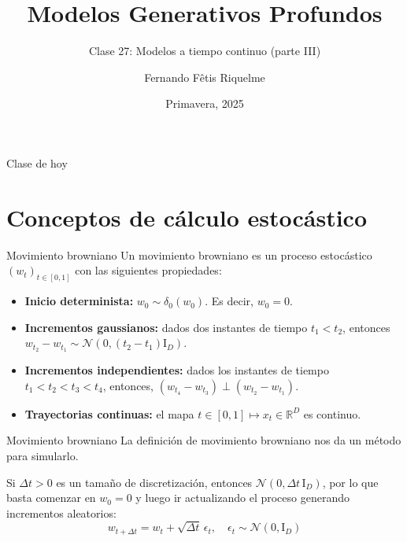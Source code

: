 \documentclass{beamer}
\title{Modelos Generativos Profundos}
\subtitle{Clase 27: Modelos a tiempo continuo (parte III)}
\author{Fernando Fêtis Riquelme}
\institute{
    Facultad de Ciencias Físicas y Matemáticas\\
    Universidad de Chile
}
\date{Primavera, 2025}
\newcommand{\R}{\mathbb{R}}
\begin{document}
\begin{frame}
    \titlepage
\end{frame}

\begin{frame}{Clase de hoy}
    \tableofcontents
\end{frame}

\section{Conceptos de cálculo estocástico}

\begin{frame}{Movimiento browniano}
    Un movimiento browniano es un proceso estocástico $(w_t)_{t\in[0,1]}$ con las siguientes propiedades:
    \begin{itemize}
        \item \textbf{Inicio determinista:} $w_0\sim\delta_0(w_0)$. Es decir, $w_0=0$.
        \item \textbf{Incrementos gaussianos:} dados dos instantes de tiempo $t_1< t_2$, entonces $w_{t_2}-w_{t_1}\sim\mathcal{N}(0,(t_2-t_1)\text{I}_D)$.
        \item \textbf{Incrementos independientes:} dados los instantes de tiempo $t_1< t_2<t_3<t_4$, entonces, $(w_{t_4}-w_{t_3})\perp (w_{t_2}-w_{t_1})$.
        \item \textbf{Trayectorias continuas:} el mapa $t\in[0,1]\mapsto x_t\in\R^D$ es continuo.
    \end{itemize}
\end{frame}

\begin{frame}{Movimiento browniano}
    La definición de movimiento browniano nos da un método para simularlo.

    Si $\Delta t>0$ es un tamaño de discretización, entonces $\mathcal{N}(0,\Delta t\,\text{I}_D)$, por lo que basta comenzar en $w_0=0$ y luego ir actualizando el proceso generando incrementos aleatorios:
    \begin{equation*}
        w_{t+\Delta t}=w_t+\sqrt{\Delta t}\,\epsilon_t,
        \quad \epsilon_t\sim\mathcal{N}(0,\text{I}_D)
    \end{equation*}
\end{frame}
\end{document}
